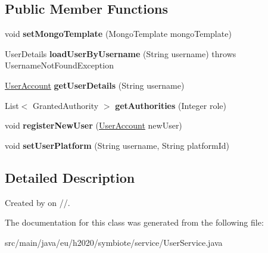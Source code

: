 \subsection*{Public Member Functions}
\begin{DoxyCompactItemize}
\item 
void {\bfseries set\+Mongo\+Template} (Mongo\+Template mongo\+Template)\hypertarget{classeu_1_1h2020_1_1symbiote_1_1service_1_1UserService_ad98b3b4302de53184e43943d75373a24}{}\label{classeu_1_1h2020_1_1symbiote_1_1service_1_1UserService_ad98b3b4302de53184e43943d75373a24}

\item 
User\+Details {\bfseries load\+User\+By\+Username} (String username)  throws Username\+Not\+Found\+Exception \hypertarget{classeu_1_1h2020_1_1symbiote_1_1service_1_1UserService_aa1f2db528e0aa578b24986c153d105cd}{}\label{classeu_1_1h2020_1_1symbiote_1_1service_1_1UserService_aa1f2db528e0aa578b24986c153d105cd}

\item 
\hyperlink{classeu_1_1h2020_1_1symbiote_1_1model_1_1UserAccount}{User\+Account} {\bfseries get\+User\+Details} (String username)\hypertarget{classeu_1_1h2020_1_1symbiote_1_1service_1_1UserService_a32700035211cce981b65ca042d1d1877}{}\label{classeu_1_1h2020_1_1symbiote_1_1service_1_1UserService_a32700035211cce981b65ca042d1d1877}

\item 
List$<$ Granted\+Authority $>$ {\bfseries get\+Authorities} (Integer role)\hypertarget{classeu_1_1h2020_1_1symbiote_1_1service_1_1UserService_a554976fec6b87213554328bd727ac4cb}{}\label{classeu_1_1h2020_1_1symbiote_1_1service_1_1UserService_a554976fec6b87213554328bd727ac4cb}

\item 
void {\bfseries register\+New\+User} (\hyperlink{classeu_1_1h2020_1_1symbiote_1_1model_1_1UserAccount}{User\+Account} new\+User)\hypertarget{classeu_1_1h2020_1_1symbiote_1_1service_1_1UserService_a806891ad445afc818e7a2600c275475c}{}\label{classeu_1_1h2020_1_1symbiote_1_1service_1_1UserService_a806891ad445afc818e7a2600c275475c}

\item 
void {\bfseries set\+User\+Platform} (String username, String platform\+Id)\hypertarget{classeu_1_1h2020_1_1symbiote_1_1service_1_1UserService_ac513e1a9ee5e6c750c5575a0eb775f75}{}\label{classeu_1_1h2020_1_1symbiote_1_1service_1_1UserService_ac513e1a9ee5e6c750c5575a0eb775f75}

\end{DoxyCompactItemize}


\subsection{Detailed Description}
Created by on //. 

The documentation for this class was generated from the following file\+:\begin{DoxyCompactItemize}
\item 
src/main/java/eu/h2020/symbiote/service/User\+Service.\+java\end{DoxyCompactItemize}
